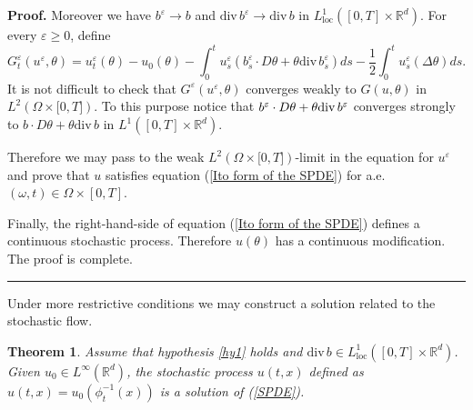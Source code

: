 \documentclass[a4paper,11pt]{article}
\newtheorem{theorem}{Theorem}
\newenvironment{proof}[1][Proof]{\textbf{#1.} }{\ \rule{0.5em}{0.5em}}
\begin{document}
\begin{proof}
Moreover we have $b^{\varepsilon }\rightarrow b$ and $\mathrm{div}%
\,b^{\varepsilon }\rightarrow \mathrm{div}\,b$ in $L_{\mathrm{loc}%
}^{1}([0,T]\times \mathbb{R}^{d})$. For every $\varepsilon \geq 0$, define
\begin{equation*}
G_{t}^{\varepsilon }(u^{\varepsilon },\theta )=u_{t}^{\varepsilon }(\theta
)-u_{0}\left( \theta \right) -\int_{0}^{t}u_{s}^{\varepsilon }\left(
b_{s}^{\varepsilon }\cdot D\theta +\theta \mathrm{div}\,b_{s}^{\varepsilon
}\right) ds-\frac{1}{2}\int_{0}^{t}u_{s}^{\varepsilon }\left( \Delta \theta
\right) ds.
\end{equation*}
It is not difficult to check that $G^{\varepsilon }(u^{\varepsilon },\theta )
$ converges weakly to $G(u,\theta )$ in $L^{2}(\Omega \times \lbrack 0,T])$.
To this purpose notice that $b^{\varepsilon }\cdot D\theta +\theta \mathrm{%
div}\,b^{\varepsilon }$ converges strongly to $b\cdot D\theta +\theta
\mathrm{div}\,b$ in $L^{1}([0,T]\times \mathbb{R}^{d})$.

Therefore we may pass to the weak $L^{2}(\Omega \times \lbrack 0,T])$-limit
in the equation for $u^{\varepsilon }$ and prove that $u$ satisfies equation
(\ref{Ito form of the SPDE}) for a.e. $\left( \omega ,t\right) \in \Omega
\times \left[ 0,T\right] $.

Finally, the right-hand-side of equation (\ref{Ito form of the SPDE})
defines a continuous stochastic process. Therefore $u(\theta )$ has a
continuous modification. The proof is complete.
\end{proof}

Under more restrictive conditions we may construct a solution related to the
stochastic flow.

\begin{theorem}
\label{them SPDE n1} Assume that hypothesis \ref{hy1} holds and $\mathrm{div}%
\,b\in L_{\mathrm{loc}}^{1}([0,T]\times \mathbb{R}^{d})$. Given $u_{0}\in
L^{\infty }({}{\mathbb{R}}^{d})$, the stochastic process $u(t,x)$ defined as
$u(t,x)=u_{0}(\phi _{t}^{-1}(x))$ is a solution of (\ref{SPDE}).
\end{theorem}
\end{document}
